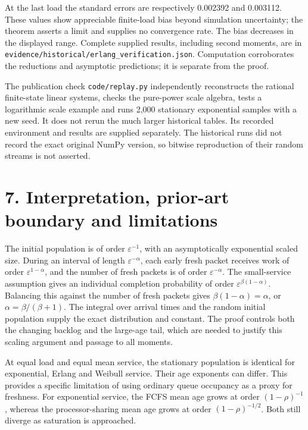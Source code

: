 \documentclass[
  11pt,
  a4paper,
]{scrartcl}
\begin{document}
At the last load the standard errors are respectively 0.002392 and
0.003112. These values show appreciable finite-load bias beyond
simulation uncertainty; the theorem asserts a limit and supplies no
convergence rate. The bias decreases in the displayed range. Complete
supplied results, including second moments, are in
\texttt{evidence/historical/erlang\_verification.json}. Computation
corroborates the reductions and asymptotic predictions; it is separate
from the proof.

The publication check \texttt{code/replay.py} independently reconstructs
the rational finite-state linear systems, checks the pure-power scale
algebra, tests a logarithmic scale example and runs 2,000 stationary
exponential samples with a new seed. It does not rerun the much larger
historical tables. Its recorded environment and results are supplied
separately. The historical runs did not record the exact original NumPy
version, so bitwise reproduction of their random streams is not
asserted.

\section{7. Interpretation, prior-art boundary and
limitations}\label{interpretation-prior-art-boundary-and-limitations}

The initial population is of order \(\varepsilon^{-1}\), with an
asymptotically exponential scaled size. During an interval of length
\(\varepsilon^{-\alpha}\), each early fresh packet receives work of
order \(\varepsilon^{1-\alpha}\), and the number of fresh packets is of
order \(\varepsilon^{-\alpha}\). The small-service assumption gives an
individual completion probability of order
\(\varepsilon^{\beta(1-\alpha)}\). Balancing this against the number of
fresh packets gives \(\beta(1-\alpha)=\alpha\), or
\(\alpha=\beta/(\beta+1)\). The integral over arrival times and the
random initial population supply the exact distribution and constant.
The proof controls both the changing backlog and the large-age tail,
which are needed to justify this scaling argument and passage to all
moments.

At equal load and equal mean service, the stationary population is
identical for exponential, Erlang and Weibull service. Their age
exponents can differ. This provides a specific limitation of using
ordinary queue occupancy as a proxy for freshness. For exponential
service, the FCFS mean age grows at order \((1-\rho)^{-1}\), whereas the
processor-sharing mean age grows at order \((1-\rho)^{-1/2}\). Both
still diverge as saturation is approached.
\end{document}
